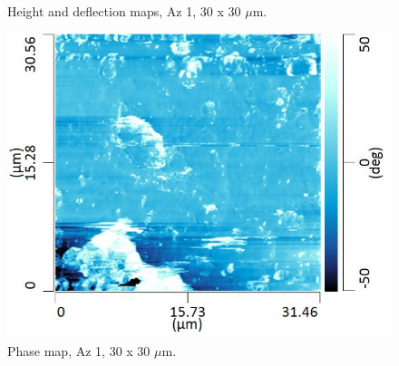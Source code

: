 \begin{figure}[H]
\begin{minipage}{.45\textwidth}
\end{minipage}
\caption[Height and deflection maps, Az 1]{Height and deflection maps, Az 1, 30 x 30 $\mu$m.}
\label{fig:afm_az1_height_def_2}
\end{figure}

\begin{figure}[H]
\centering
  \includegraphics[width=.45\textwidth]{Az1_tapping_mode_240521_phase_2}
\caption[Phase map, Az 1]{Phase map, Az 1, 30 x 30 $\mu$m.}
\label{fig:afm_az1_phase_2}
\end{figure}


